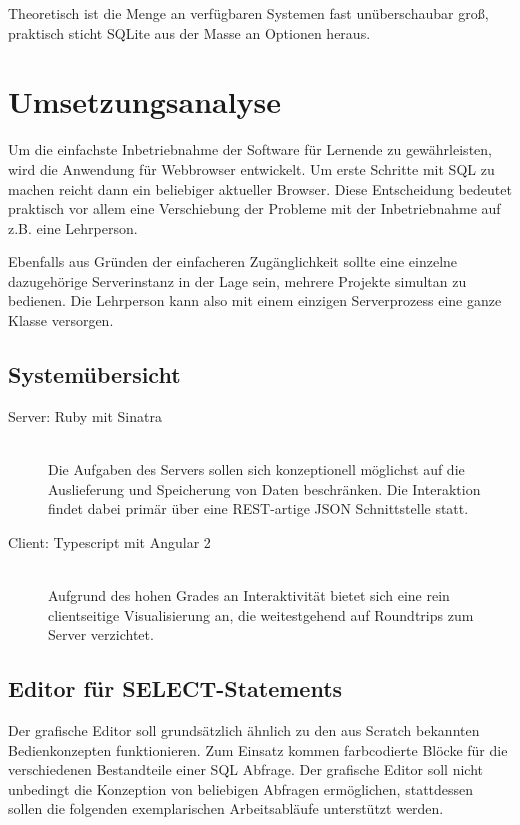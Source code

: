 \documentclass[paper=a4,fontsize=11pt,parskip=half]{scrartcl}
\begin{document}
Theoretisch ist die Menge an verfügbaren Systemen fast unüberschaubar groß, praktisch sticht SQLite aus der Masse an Optionen heraus.


\section{Umsetzungsanalyse}

Um die einfachste Inbetriebnahme der Software für Lernende zu gewährleisten, wird die Anwendung für Webbrowser entwickelt. Um erste Schritte mit SQL zu machen reicht dann ein beliebiger aktueller Browser. Diese Entscheidung bedeutet praktisch vor allem eine Verschiebung der Probleme mit der Inbetriebnahme auf z.B. eine Lehrperson.

Ebenfalls aus Gründen der einfacheren Zugänglichkeit sollte eine einzelne dazugehörige Serverinstanz in der Lage sein, mehrere Projekte simultan zu bedienen. Die Lehrperson kann also mit einem einzigen Serverprozess eine ganze Klasse versorgen.


\subsection{Systemübersicht}

\begin{description}
\item[Server: Ruby mit Sinatra] \hfill\\
  Die Aufgaben des Servers sollen sich konzeptionell möglichst auf die Auslieferung und Speicherung von Daten beschränken. Die Interaktion findet dabei primär über eine REST-artige JSON Schnittstelle statt.
\item[Client: Typescript mit Angular 2] \hfill\\
  Aufgrund des hohen Grades an Interaktivität bietet sich eine rein clientseitige Visualisierung an, die weitestgehend auf Roundtrips zum Server verzichtet.
\end{description}

\subsection{Editor für SELECT-Statements}

Der grafische Editor soll grundsätzlich ähnlich zu den aus Scratch bekannten Bedienkonzepten funktionieren. Zum Einsatz kommen farbcodierte Blöcke für die verschiedenen Bestandteile einer SQL Abfrage. Der grafische Editor soll nicht unbedingt die Konzeption von beliebigen Abfragen ermöglichen, stattdessen sollen die folgenden exemplarischen Arbeitsabläufe unterstützt werden.
\end{document}
